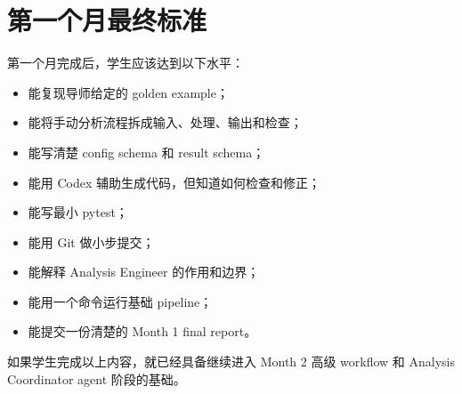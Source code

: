 \documentclass[11pt,a4paper,fontset=fandol]{ctexart}
\begin{document}
\section{第一个月最终标准}

第一个月完成后，学生应该达到以下水平：

\begin{itemize}[leftmargin=2em]
  \item 能复现导师给定的 golden example；
  \item 能将手动分析流程拆成输入、处理、输出和检查；
  \item 能写清楚 config schema 和 result schema；
  \item 能用 Codex 辅助生成代码，但知道如何检查和修正；
  \item 能写最小 pytest；
  \item 能用 Git 做小步提交；
  \item 能解释 Analysis Engineer 的作用和边界；
  \item 能用一个命令运行基础 pipeline；
  \item 能提交一份清楚的 Month 1 final report。
\end{itemize}

如果学生完成以上内容，就已经具备继续进入 Month 2 高级 workflow 和 Analysis Coordinator agent 阶段的基础。
\end{document}
